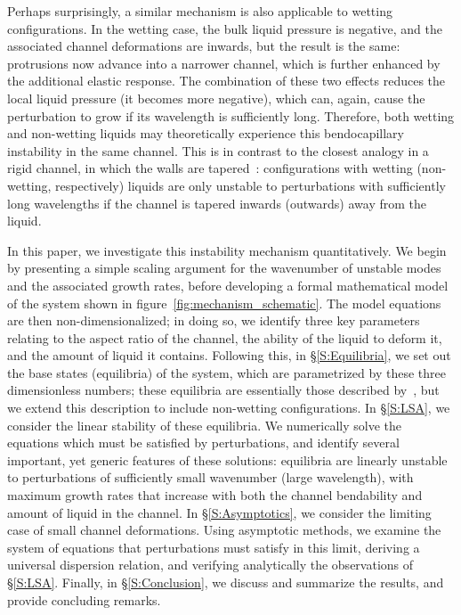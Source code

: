 \documentclass{jfm}
\begin{document}
Perhaps surprisingly, a similar mechanism is also applicable to wetting configurations. In the wetting case, the bulk liquid pressure is negative, and the associated channel deformations are inwards, but the result is the same: protrusions now advance into a narrower channel, which is further enhanced by the additional elastic response. The combination of these two effects reduces the local liquid pressure (it becomes more negative), which can, again, cause the perturbation to grow if its wavelength is sufficiently long. Therefore, both wetting and non-wetting liquids may theoretically experience this bendocapillary instability in the same channel. This is in contrast to the closest analogy in a rigid channel, in which the walls are tapered~\cite{AlHousseiny2012NaturePhysics}: configurations with wetting (non-wetting, respectively) liquids are only unstable to perturbations with sufficiently long wavelengths if the channel is tapered inwards (outwards) away from the liquid.

In this paper, we investigate this instability mechanism quantitatively. We begin by presenting a simple scaling argument for the wavenumber of unstable modes and the associated growth rates, before developing a formal mathematical model of the system shown in figure~\ref{fig:mechanism_schematic}. The model equations are then non-dimensionalized; in doing so, we identify three key parameters relating to the aspect ratio of the channel, the ability of the liquid to deform it, and the amount of liquid it contains. Following this, in \S\ref{S:Equilibria}, we set out the base states (equilibria) of the system, which are parametrized by these three dimensionless numbers; these equilibria are essentially those described by~\citet{Taroni2012JFM}, but we extend this description to include non-wetting configurations. In \S\ref{S:LSA}, we consider the linear stability of these equilibria. We numerically solve the equations which must be satisfied by perturbations, and identify several important, yet generic features of these solutions: equilibria are linearly unstable to perturbations of sufficiently small wavenumber (large wavelength), with maximum growth rates that increase with both the channel bendability and amount of liquid in the channel. In \S\ref{S:Asymptotics}, we consider the limiting case of small channel deformations. Using asymptotic methods, we examine the system of equations that perturbations must satisfy in this limit, deriving a universal dispersion relation, and verifying analytically the observations of \S\ref{S:LSA}. Finally, in \S\ref{S:Conclusion}, we discuss and summarize the results, and provide concluding remarks.
\end{document}
